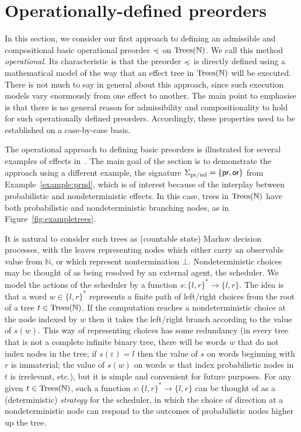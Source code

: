\section{Operationally-defined preorders}
\label{section:operational}

In this section, we consider our first approach to defining an admissible and compositional basic operational
preorder $\preccurlyeq$ on $\textnormal{Trees}(\mathbb{N})$. We call this method \emph{operational}. Its characteristic is that the preorder
 $\preccurlyeq$ is directly defined using a mathematical model of the way that an effect tree in $\textnormal{Trees}(\mathbb{\mathbb{N}})$ will be executed.
There is not much to say in general about this approach, since such execution models vary enormously from one effect to another.
The main point to emphasise is that there is no general reason for  admissibility and compositionality to hold for such operationally defined preorders. Accordingly, these properties need to be established on a case-by-case basis.

The operational approach to defining basic preorders is illustrated for several examples of effects in~\cite{gom}. 
The main goal of the section is to demonstrate the approach using a different example, the signature
$\Sigma_{\text{pr/nd}} = \{\operatorname{\textsf{pr}},\operatorname{\textsf{or}}\}$ from Example~\ref{example:prnd}, which is of interest because of the 
interplay between probabilistic and nondeterministic effects. 
In this case, trees in $\textnormal{Trees}(\mathbb{N})$ have both probabilistic and nondeterministic branching nodes,
as in Figure~\ref{fig:exampletrees}.


It is natural to consider such trees as (countable state) Markov decision processes, with the leaves representing nodes which either carry an observable value from $\mathbb{N}$, or which represent nontermination $\bot$.
Nondeterministic choices may be thought of as being resolved by an external agent, the scheduler. We model the actions of the scheduler by a 
function $s: \{l,r\}^* \to \{l,r\}$. The idea is that a word $w \in \{l,r\}^*$ represents a finite path of left/right choices from the root of a 
tree $t \in \textnormal{Trees}(\mathbb{N})$. If the computation reaches a nondeterministic choice at the node indexed by 
$w$ then it takes the left/right branch according to the value of $s(w)$. This way of representing choices has some redundancy
(in every tree that is not a complete infinite binary tree, there will be words $w$ that do not index nodes in the tree; if $s(\varepsilon) = l$ then the value of $s$ on words beginning with $r$ is immaterial; the value of $s(w)$ on words $w$ that index 
probabilistic nodes in $t$ is irrelevant, etc.), but it is simple and convenient for future purposes. 
For any given $t \in \textnormal{Trees}(\mathbb{N})$, such a function
$s: \{l,r\}^* \to \{l,r\}$ can be thought of as a (deterministic) \emph{strategy} for the scheduler, in which the choice of direction at a nondeterministic node  
can respond to  the outcomes of probabilistic nodes higher up the tree.

